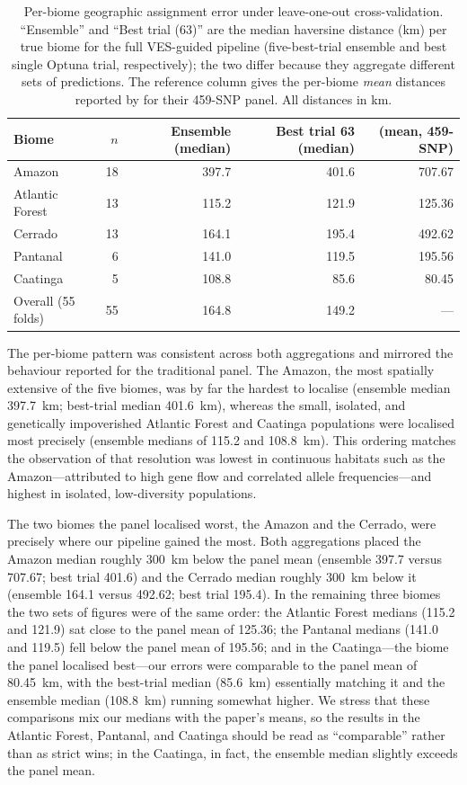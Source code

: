 \documentclass[twocolumn,10pt]{article}
\begin{document}
\begin{table}[t]
\centering
\caption{Per-biome geographic assignment error under leave-one-out cross-validation. ``Ensemble''
and ``Best trial (63)'' are the median haversine distance (km) per true biome for the full
VES-guided pipeline (five-best-trial ensemble and best single Optuna trial, respectively); the two
differ because they aggregate different sets of predictions. The reference column gives the
per-biome \emph{mean} distances reported by \citet{lazzari2025development} for their 459-SNP panel.
All distances in km.}
\begin{tabular}{lrrrr}
\toprule
Biome
  & $n$
  & Ensemble (median)
  & Best trial 63 (median)
  & \citet{lazzari2025development} (mean, 459-SNP) \\
\midrule
Amazon          & 18 & 397.7 & 401.6 & 707.67 \\
Atlantic Forest & 13 & 115.2 & 121.9 & 125.36 \\
Cerrado         & 13 & 164.1 & 195.4 & 492.62 \\
Pantanal        &  6 & 141.0 & 119.5 & 195.56 \\
Caatinga        &  5 & 108.8 &  85.6 &  80.45 \\
\midrule
Overall (55 folds) & 55 & 164.8 & 149.2 & --- \\
\bottomrule
\end{tabular}
\end{table}

The per-biome pattern was consistent across both aggregations and mirrored the behaviour reported
for the traditional panel. The Amazon, the most spatially extensive of the five biomes, was by far
the hardest to localise (ensemble median 397.7~km; best-trial median 401.6~km), whereas the small,
isolated, and genetically impoverished Atlantic Forest and Caatinga populations were localised most
precisely (ensemble medians of 115.2 and 108.8~km). This ordering matches the observation of
\citet{lazzari2025development} that resolution was lowest in continuous habitats such as the
Amazon---attributed to high gene flow and correlated allele frequencies---and highest in isolated,
low-diversity populations.

The two biomes the panel localised worst, the Amazon and the Cerrado, were precisely where our
pipeline gained the most. Both aggregations placed the Amazon median roughly 300~km below the panel
mean (ensemble 397.7 versus 707.67; best trial 401.6) and the Cerrado median roughly 300~km below it
(ensemble 164.1 versus 492.62; best trial 195.4). In the remaining three biomes the two sets of
figures were of the same order: the Atlantic Forest medians (115.2 and 121.9) sat close to the panel
mean of 125.36; the Pantanal medians (141.0 and 119.5) fell below the panel mean of 195.56; and in
the Caatinga---the biome the panel localised best---our errors were comparable to the panel mean of
80.45~km, with the best-trial median (85.6~km) essentially matching it and the ensemble median
(108.8~km) running somewhat higher. We stress that these comparisons mix our medians with the
paper's means, so the results in the Atlantic Forest, Pantanal, and Caatinga should be read as
``comparable'' rather than as strict wins; in the Caatinga, in fact, the ensemble median slightly
exceeds the panel mean.
\end{document}
